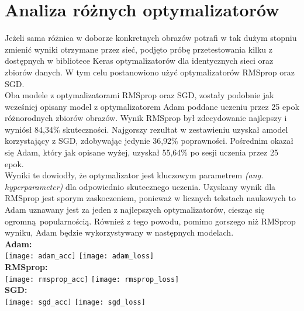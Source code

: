 \section{Analiza różnych optymalizatorów}
Jeżeli sama różnica w doborze konkretnych obrazów potrafi w tak dużym stopniu zmienić wyniki
otrzymane przez sieć, podjęto próbę przetestowania kilku z dostępnych w bibliotece Keras
optymalizatorów dla identycznych sieci oraz zbiorów danych. W tym celu postanowiono użyć
optymalizatorów RMSprop oraz SGD.\\
Oba modele z optymalizatorami RMSprop oraz SGD, zostały podobnie jak wcześniej opisany model
z optymalizatorem Adam poddane uczeniu przez 25 epok różnorodnych zbiorów obrazów. Wynik RMSprop
był zdecydowanie najlepszy i wyniósł 84,34\% skuteczności. Najgorszy rezultat w zestawieniu
uzyskał amodel korzystający z SGD, zdobywając jedynie 36,92\% poprawności. Pośrednim okazał
się Adam, który jak opisane wyżej, uzyskał 55,64\% po sesji uczenia przez 25 epok.\\
Wyniki te dowiodły, że optymalizator jest kluczowym parametrem \textit{(ang. hyperparameter)}
dla odpowiednio skutecznego uczenia. Uzyskany wynik dla RMSprop jest sporym zaskoczeniem,
ponieważ w licznych tekstach naukowych to Adam uznawany jest za jeden z najlepszych
optymalizatorów, ciesząc się ogromną popularnością. Również z tego powodu, pomimo
gorszego niż RMSprop wyniku, Adam będzie wykorzystywany w następnych modelach.\\
\textbf{Adam:}\\
\texttt{[image: adam\_acc]}
\texttt{[image: adam\_loss]}\\
\textbf{RMSprop:}\\
\texttt{[image: rmsprop\_acc]}
\texttt{[image: rmsprop\_loss]}\\
\textbf{SGD:}\\
\texttt{[image: sgd\_acc]}
\texttt{[image: sgd\_loss]}\\

